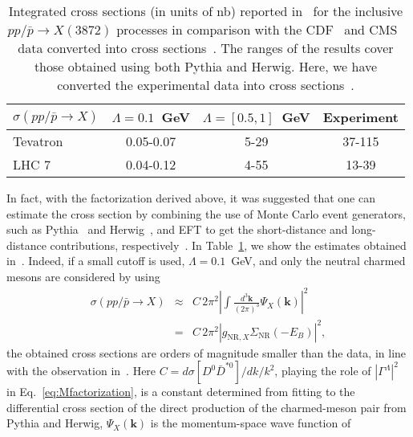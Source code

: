 \begin{table}[t]
  \caption{Integrated cross sections (in units of nb) reported
in~\cite{Albaladejo:2017} for the inclusive $pp/\bar
p\to X(3872)$ processes in comparison with the
CDF~\cite{Bauer:2004bc} and CMS~\cite{Chatrchyan:2013cld} data converted into
cross sections~\cite{Guo:2014sca}. The ranges of the results cover those
obtained using both Pythia and Herwig. Here, we have
converted the experimental data into cross sections~\cite{Guo:2014sca}. }
\begin{ruledtabular}
\begin{tabular}{ l  c  c  c   }
  $\sigma(pp/\bar p\to X)$   & $\Lambda=0.1$~GeV   & $\Lambda=[0.5,1]$~GeV  &
Experiment \\
 \hline
 Tevatron   & 0.05-0.07         & 5-29   &  37-115   \\%
 LHC 7      & 0.04-0.12         & 4-55   &  13-39    \\%
\end{tabular}
\label{tab:crossec}
\end{ruledtabular}
\end{table}
In fact, with the factorization derived above, it was suggested that one can
estimate the cross section by combining the use of Monte Carlo event
generators, such as Pythia~\cite{Sjostrand:2007gs} and
Herwig~\cite{Bahr:2008pv},
and EFT to get the short-distance and long-distance contributions,
respectively~\cite{Artoisenet:2009wk,Artoisenet:2010uu,Guo:2014sca}. In
Table~\ref{tab:crossec}, we show the estimates obtained
in~\cite{Albaladejo:2017}. Indeed, if a small cutoff is used,
$\Lambda=0.1$~GeV,  and only the neutral charmed
mesons are considered by using~\cite{Guo:2014ppa,Guo:2014sca}
\begin{eqnarray}
  \sigma(pp/\bar p\to X)
  &\approx& C\, 2\pi^2 \left|\int \frac{d^3{\bm
  k}}{(2\pi)^3} \Psi_X({\bm k})\right|^2 \, \nonumber\\
  &=& C\, 2\pi^2 \left| g_{\text{NR},X}^{} \Sigma_\text{NR}^{}(-E_B)\right|^2,
\end{eqnarray}
the obtained cross sections are orders of magnitude smaller than the data, in
line with the observation in~\cite{Bignamini:2009sk}.
Here $C=d\sigma[D^0\bar D^{*0}]/dk/k^2$, playing the role of
$|\Gamma^\Lambda|^2$ in Eq.~\eqref{eq:Mfactorization}, is a constant determined
from fitting to the
differential cross section of the direct production of the charmed-meson pair
from Pythia and Herwig, $\Psi_X(\bm{k})$ is the momentum-space wave function of
